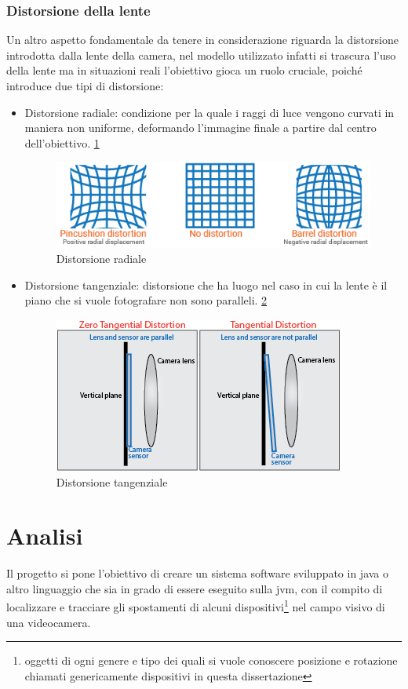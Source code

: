 \documentclass[12pt,a4paper,openright,twoside]{book}
\begin{document}
\subsection{Distorsione della lente}
Un altro aspetto fondamentale da tenere in considerazione riguarda la distorsione introdotta dalla lente della camera, nel modello utilizzato infatti si trascura l'uso della lente ma in situazioni reali l'obiettivo gioca un ruolo cruciale, poiché introduce due tipi di distorsione:
\begin{itemize}
	\item Distorsione radiale: condizione per la quale i raggi di luce vengono curvati in maniera non uniforme, deformando l'immagine finale a partire dal centro dell'obiettivo. \ref{fig:radial_distortion}
	\begin{figure}
		\centering
		\includegraphics[width=0.5\linewidth]{./figures/radial_distortion.png}
		\caption{Distorsione radiale}
		\label{fig:radial_distortion}
	\end{figure}
	\item  Distorsione tangenziale: distorsione che ha luogo nel caso in cui la lente è il piano che si vuole fotografare non sono paralleli. \ref{fig:tangential_distortion}
	\begin{figure}
		\centering
		\includegraphics[width=0.5\linewidth]{./figures/tangential_distortion.png}
		\caption{Distorsione tangenziale}
		\label{fig:tangential_distortion}
	\end{figure}
\end{itemize} 

\chapter{Analisi}
Il progetto si pone l'obiettivo di creare un sistema software sviluppato in java o altro linguaggio che sia in grado di essere eseguito sulla \acrfull{jvm}, con il compito di localizzare e tracciare gli spostamenti di alcuni dispositivi\footnote{oggetti di ogni genere e tipo dei quali si vuole conoscere posizione e rotazione chiamati genericamente dispositivi in questa dissertazione} nel campo visivo di una videocamera.
\end{document}
